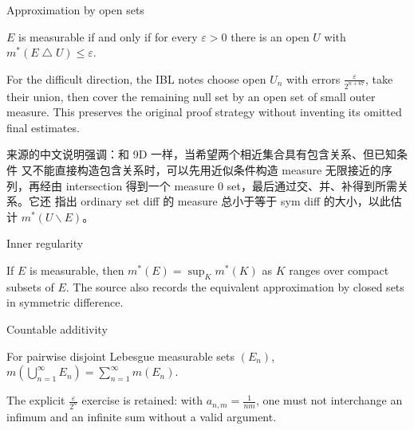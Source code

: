 \begin{theorem}{Approximation by open sets}

\(E\) is measurable if and only if for every \(\varepsilon > 0\) there is an open \(U\) with \(m^{\ast}\left( {E \bigtriangleup U} \right) \leq \varepsilon\).

\end{theorem}

For the difficult direction, the IBL notes choose open \(U_{n}\) with errors \(\frac{\varepsilon}{2^{n + 67}}\), take their union, then cover the remaining null set by an open set of small outer measure. This preserves the original proof strategy without inventing its omitted final estimates.

来源的中文说明强调：和 9D 一样，当希望两个相近集合具有包含关系、但已知条件 又不能直接构造包含关系时，可以先用近似条件构造 measure 无限接近的序列，再经由 intersection 得到一个 measure \(0\) set，最后通过交、并、补得到所需关系。它还 指出 ordinary set diff 的 measure 总小于等于 sym diff 的大小，以此估计 \(m^{\ast}\left( {U \smallsetminus E} \right)\)。

\begin{theorem}{Inner regularity}

If \(E\) is measurable, then \(m^{\ast}(E) = \sup_{K}m^{\ast}(K)\) as \(K\) ranges over compact subsets of \(E\). The source also records the equivalent approximation by closed sets in symmetric difference.

\end{theorem}

\begin{theorem}{Countable additivity}

For pairwise disjoint Lebesgue measurable sets \(\left( E_{n} \right)\), \(m\left( {\bigcup_{n = 1}^{\infty}E_{n}} \right) = \sum_{n = 1}^{\infty}m\left( E_{n} \right)\).

\end{theorem}

The explicit \(\frac{\varepsilon}{2^{n}}\) exercise is retained: with \(a_{n,m} = \frac{1}{nm}\), one must not interchange an infimum and an infinite sum without a valid argument.
